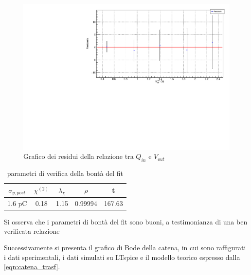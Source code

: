 \documentclass{article}
\begin{document}
\begin{center}
\begin{figure}[H]
\centering
\includegraphics[scale=0.4, angle=0]{residuicatena.pdf}
\caption{Grafico dei residui della relazione tra $Q_{in}$ e $V_{out}$}
\label{fig:catenaQvsV_res}
\end{figure}
\end{center}

\begin{table}[ht]
    \centering
    \begin{tabular}{ccccc}
        \toprule
        $\sigma_{y, post}$    &$\chi^{(2)}$    &$\lambda_{\chi}$   &$\rho$ &t   \\
        \midrule
        1.6 pC                &0.18            &1.15               &0.99994&167.63\\
        \bottomrule
    \end{tabular}
    \caption{parametri di verifica della bontà del fit}
\end{table}

Si osserva che i parametri di bontà del fit sono buoni, a testimonianza di una ben verificata relazione

Successivamente si presenta il grafico di Bode della catena, in cui sono raffigurati i dati sperimentali, i dati simulati
su LTspice e il modello teorico espresso dalla \ref{eqn:catena_trasf}.
\end{document}

